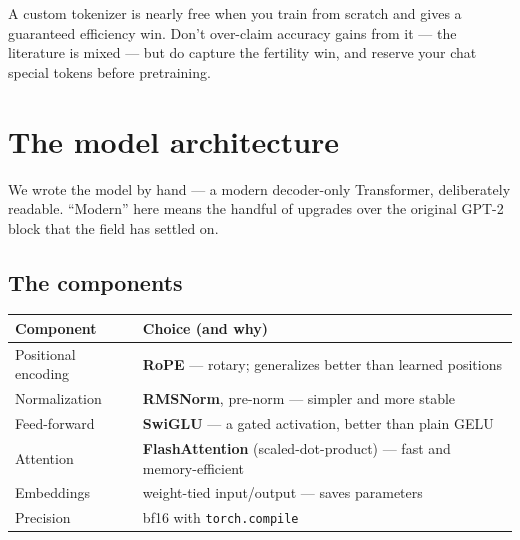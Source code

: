 \begin{lesson}
A custom tokenizer is nearly free when you train from scratch and gives a guaranteed efficiency win. Don't
over-claim accuracy gains from it --- the literature is mixed --- but do capture the fertility win, and reserve
your chat special tokens before pretraining.
\end{lesson}

\chapter{The model architecture}

We wrote the model by hand --- a modern decoder-only Transformer, deliberately readable. ``Modern'' here means
the handful of upgrades over the original GPT-2 block that the field has settled on.


\section{The components}
\begin{center}\small
\begin{tabular}{@{}ll@{}}
\toprule
\textbf{Component} & \textbf{Choice (and why)}\\
\midrule
Positional encoding & \textbf{RoPE} --- rotary; generalizes better than learned positions\\
Normalization & \textbf{RMSNorm}, pre-norm --- simpler and more stable\\
Feed-forward & \textbf{SwiGLU} --- a gated activation, better than plain GELU\\
Attention & \textbf{FlashAttention} (scaled-dot-product) --- fast and memory-efficient\\
Embeddings & weight-tied input/output --- saves parameters\\
Precision & bf16 with \texttt{torch.compile}\\
\bottomrule
\end{tabular}
\end{center}



